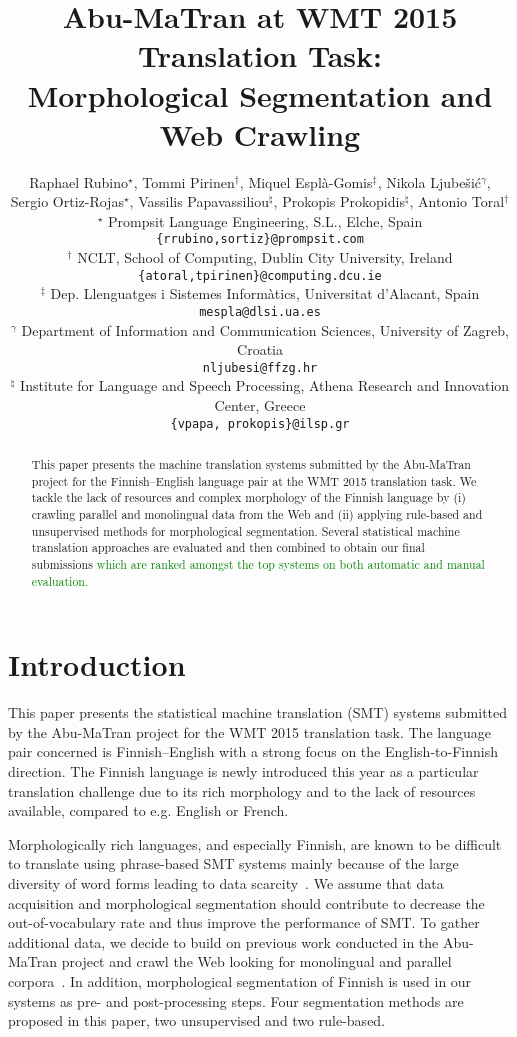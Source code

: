 \documentclass[postprint]{flammie}
\title{Abu-MaTran at WMT 2015 Translation Task:\\Morphological Segmentation and Web Crawling
\footnotepubrights{The official publication was in WMT 2015 workshop, in
EMNLP 2015, and published version can be found in 
\url{http://statmt.org/wmt15/papers.html} 
or ACL anthology.}}
\author{Raphael Rubino$^{\star}$, Tommi Pirinen$^{\dag}$, 
Miquel Esplà-Gomis$^{\ddag}$, Nikola Ljubešić$^{\gamma}$,\\
Sergio Ortiz-Rojas$^{\star}$, Vassilis Papavassiliou$^{\natural}$,
Prokopis Prokopidis$^{\natural}$, Antonio Toral$^{\dag}$\vspace*{.2cm}\\
$^{\star}$ Prompsit Language Engineering, S.L., Elche, Spain\\
\small{\texttt{\{rrubino,sortiz\}@prompsit.com}}\\
$^\dag$ NCLT, School of Computing, Dublin City University, Ireland\\
\small{\texttt{\{atoral,tpirinen\}@computing.dcu.ie}}\\
$^\ddag$ Dep. Llenguatges i Sistemes Informàtics, Universitat d’Alacant, Spain\\
\small{\texttt{mespla@dlsi.ua.es}}\\
$^\gamma$ Department of Information and Communication Sciences, University of Zagreb, Croatia\\
\small{\texttt{nljubesi@ffzg.hr}}\\
$^{\natural}$ Institute for Language and Speech Processing, Athena Research and Innovation Center, Greece\\
\small{\texttt{\{vpapa, prokopis\}@ilsp.gr}}}
\date{}
\begin{document}
\maketitle

\begin{abstract}
This paper presents the machine translation systems submitted by the Abu-MaTran project for the Finnish--English language pair at the WMT 2015 translation task.
We tackle the lack of resources and complex morphology of the Finnish language by (i) crawling parallel and monolingual data from the Web and (ii) applying rule-based and unsupervised methods for morphological segmentation.
Several statistical machine translation approaches are evaluated and then combined to obtain our final submissions \textcolor{green}{which are ranked amongst the top systems on both automatic and manual evaluation.}
\end{abstract}


\section{Introduction}
\label{section:introduction}
%
This paper presents the statistical machine translation (SMT) systems submitted by the Abu-MaTran project for the WMT 2015 translation task. The language pair concerned is Finnish--English with a strong focus on the English-to-Finnish direction. The Finnish language is newly introduced this year as a particular translation challenge due to its rich morphology and to the lack of resources available, compared to e.g. English or French. 
%

Morphologically rich languages, and especially Finnish, are known to be difficult to translate using phrase-based SMT systems mainly because of the large diversity of word forms leading to data scarcity~\cite{koehn2005europarl}. We assume that data acquisition and morphological segmentation should contribute to decrease the out-of-vocabulary rate and thus improve the performance of SMT. To gather additional data, we decide to build on previous work conducted in the Abu-MaTran project and crawl the Web looking for monolingual and parallel corpora~\cite{toral2014extrinsic}. In addition, morphological segmentation of Finnish is used in our systems as pre- and post-processing steps. Four segmentation methods are proposed in this paper, two unsupervised and two rule-based.
%
\end{document}
